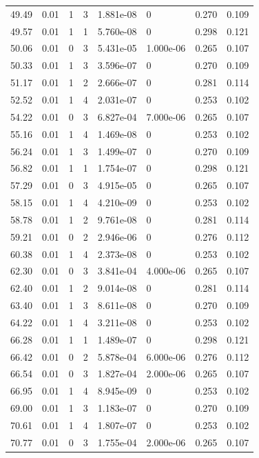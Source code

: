 \documentclass[preview]{standalone}
\begin{document}
{{{\begin{tabular}{L{1.2cm}C{1.2cm} C{0.3cm}C{0.5cm} C{1.4cm}C{1.4cm} C{1.4cm}C{1.4cm}}
  49.49  &  0.01  & 1     &  3 &  1.881e-08  & 0  & 0.270 &  0.109   \\ 
  49.57  &  0.01  & 1     &  1 &  5.760e-08  & 0  & 0.298 &  0.121   \\ 
  50.06  &  0.01  & 0     &  3 &  5.431e-05  & 1.000e-06  & 0.265 &  0.107   \\ 
  50.33  &  0.01  & 1     &  3 &  3.596e-07  & 0  & 0.270 &  0.109   \\ 
  51.17  &  0.01  & 1     &  2 &  2.666e-07  & 0  & 0.281 &  0.114   \\ 
  52.52  &  0.01  & 1     &  4 &  2.031e-07  & 0  & 0.253 &  0.102   \\ 
  54.22  &  0.01  & 0     &  3 &  6.827e-04  & 7.000e-06  & 0.265 &  0.107   \\ 
  55.16  &  0.01  & 1     &  4 &  1.469e-08  & 0  & 0.253 &  0.102   \\ 
  56.24  &  0.01  & 1     &  3 &  1.499e-07  & 0  & 0.270 &  0.109   \\ 
  56.82  &  0.01  & 1     &  1 &  1.754e-07  & 0  & 0.298 &  0.121   \\ 
  57.29  &  0.01  & 0     &  3 &  4.915e-05  & 0  & 0.265 &  0.107   \\ 
  58.15  &  0.01  & 1     &  4 &  4.210e-09  & 0  & 0.253 &  0.102   \\ 
  58.78  &  0.01  & 1     &  2 &  9.761e-08  & 0  & 0.281 &  0.114   \\ 
  59.21  &  0.01  & 0     &  2 &  2.946e-06  & 0  & 0.276 &  0.112   \\ 
  60.38  &  0.01  & 1     &  4 &  2.373e-08  & 0  & 0.253 &  0.102   \\ 
  62.30  &  0.01  & 0     &  3 &  3.841e-04  & 4.000e-06  & 0.265 &  0.107   \\ 
  62.40  &  0.01  & 1     &  2 &  9.014e-08  & 0  & 0.281 &  0.114   \\ 
  63.40  &  0.01  & 1     &  3 &  8.611e-08  & 0  & 0.270 &  0.109   \\ 
  64.22  &  0.01  & 1     &  4 &  3.211e-08  & 0  & 0.253 &  0.102   \\ 
  66.28  &  0.01  & 1     &  1 &  1.489e-07  & 0  & 0.298 &  0.121   \\ 
  66.42  &  0.01  & 0     &  2 &  5.878e-04  & 6.000e-06  & 0.276 &  0.112   \\ 
  66.54  &  0.01  & 0     &  3 &  1.827e-04  & 2.000e-06  & 0.265 &  0.107   \\ 
  66.95  &  0.01  & 1     &  4 &  8.945e-09  & 0  & 0.253 &  0.102   \\ 
  69.00  &  0.01  & 1     &  3 &  1.183e-07  & 0  & 0.270 &  0.109   \\ 
  70.61  &  0.01  & 1     &  4 &  1.807e-07  & 0  & 0.253 &  0.102   \\ 
  70.77  &  0.01  & 0     &  3 &  1.755e-04  & 2.000e-06  & 0.265 &  0.107   \\ 
\hline 
\end{tabular} 

}}}
\end{document}
